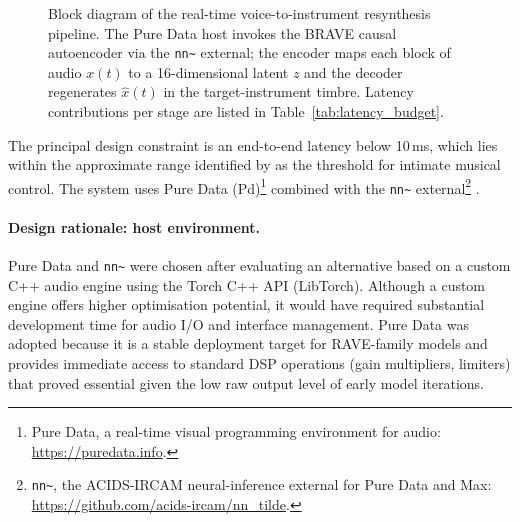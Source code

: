 \documentclass[a4paper,11pt,oneside,openany]{book}
\begin{document}
\begin{figure}[H]
{}
\caption{Block diagram of the real-time voice-to-instrument resynthesis pipeline. The Pure Data host invokes the BRAVE causal autoencoder via the \texttt{nn\textasciitilde} external; the encoder maps each block of audio $x(t)$ to a 16-dimensional latent $z$ and the decoder regenerates $\hat{x}(t)$ in the target-instrument timbre. Latency contributions per stage are listed in Table~\ref{tab:latency_budget}.}
\label{fig:block_diagram}
\end{figure}

The principal design constraint is an end-to-end latency below 10\,ms, which lies within the approximate range identified by \textcite{wessel2002intimate} as the threshold for intimate musical control. The system uses Pure Data (Pd)\footnote{Pure Data, a real-time visual programming environment for audio: \url{https://puredata.info}.} combined with the \texttt{nn\textasciitilde} external\footnote{\texttt{nn\textasciitilde}, the ACIDS-IRCAM neural-inference external for Pure Data and Max: \url{https://github.com/acids-ircam/nn_tilde}.} \parencite{caillon2021rave}.

\paragraph{Design rationale: host environment.} Pure Data and \texttt{nn\textasciitilde} were chosen after evaluating an alternative based on a custom C++ audio engine using the Torch C++ API (LibTorch). Although a custom engine offers higher optimisation potential, it would have required substantial development time for audio I/O and interface management. Pure Data was adopted because it is a stable deployment target for RAVE-family models \parencite{caillon2021rave} and provides immediate access to standard DSP operations (gain multipliers, limiters) that proved essential given the low raw output level of early model iterations.
\end{document}
